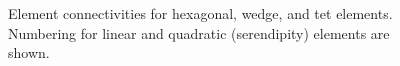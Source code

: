 \documentclass[11pt]{article}
\begin{document}
\begin{figure}[h!p]
\centering
     \hspace{0.4in}
      \hspace{0.4in}
      \hspace{0.4in}
     \caption{Element connectivities for hexagonal, wedge, and tet
     elements. Numbering for linear and quadratic (serendipity) elements are
     shown.}
\end{figure}
\end{document}

